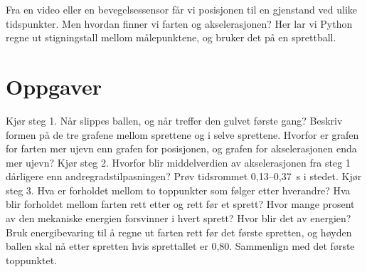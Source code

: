 \documentclass[11pt]{article}
\begin{document}

Fra en video eller en bevegelsessensor får vi posisjonen til en gjenstand ved ulike tidspunkter. Men hvordan finner vi farten og akselerasjonen? Her lar vi Python regne ut stigningstall mellom målepunktene, og bruker det på en sprettball.

\section*{Oppgaver}

\begin{oppgaveliste}
\oppgave {}Kjør steg 1. Når slippes ballen, og når treffer den gulvet første gang? Beskriv formen på de tre grafene mellom sprettene og i selve sprettene.
\svar
\oppgave {}Hvorfor er grafen for farten mer ujevn enn grafen for posisjonen, og grafen for akselerasjonen enda mer ujevn?
\svar
\oppgave {}Kjør steg 2. Hvorfor blir middelverdien av akselerasjonen fra steg 1 dårligere enn andregradstilpasningen? Prøv tidsrommet 0,13–0,37~s i stedet.
\svar
\oppgave {}Kjør steg 3. Hva er forholdet mellom to toppunkter som følger etter hverandre? Hva blir forholdet mellom farten rett etter og rett før et sprett?
\svar
\oppgave {}Hvor mange prosent av den mekaniske energien forsvinner i hvert sprett? Hvor blir det av energien?
\svar
\oppgave {}Bruk energibevaring til å regne ut farten rett før det første spretten, og høyden ballen skal nå etter spretten hvis sprettallet er 0,80. Sammenlign med det første toppunktet.
\svar
\end{oppgaveliste}
\end{document}
